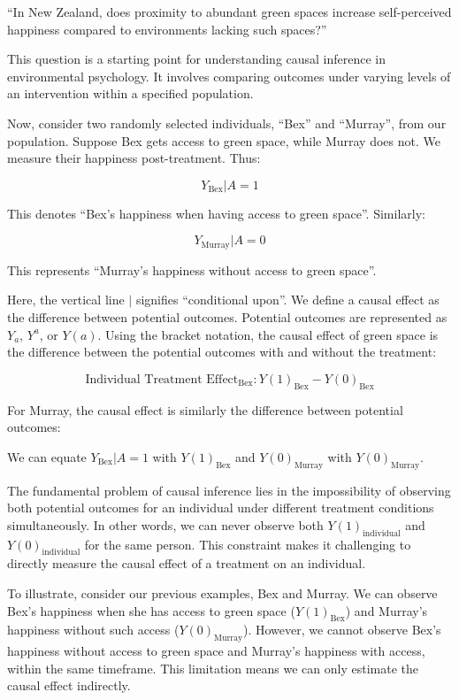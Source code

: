 \documentclass[
  singlecolumn]{article}
\begin{document}
``In New Zealand, does proximity to abundant green spaces increase
self-perceived happiness compared to environments lacking such spaces?''

This question is a starting point for understanding causal inference in
environmental psychology. It involves comparing outcomes under varying
levels of an intervention within a specified population.

Now, consider two randomly selected individuals, ``Bex'' and ``Murray'',
from our population. Suppose Bex gets access to green space, while
Murray does not. We measure their happiness post-treatment. Thus:

\[Y_{\text{Bex}}|A = 1 \]

This denotes ``Bex's happiness when having access to green space''.
Similarly:

\[Y_{\text{Murray}}|A = 0 \]

This represents ``Murray's happiness without access to green space''.

Here, the vertical line \(|\) signifies ``conditional upon''. We define
a causal effect as the difference between potential outcomes. Potential
outcomes are represented as \(Y_a\), \(Y^a\), or \(Y(a)\). Using the
bracket notation, the causal effect of green space is the difference
between the potential outcomes with and without the treatment:

\[\text{Individual Treatment Effect}_{\text{Bex}}: Y(1)_{\text{Bex}} - Y(0)_{\text{Bex}}\]

For Murray, the causal effect is similarly the difference between
potential outcomes:

We can equate \(Y_{\text{Bex}}|A = 1\) with \(Y(1)_{\text{Bex}}\) and
\(Y(0)_{\text{Murray}}\) with \(Y(0)_{\text{Murray}}\).

The fundamental problem of causal inference lies in the impossibility of
observing both potential outcomes for an individual under different
treatment conditions simultaneously. In other words, we can never
observe both \(Y(1)_{\text{individual}}\) and
\(Y(0)_{\text{individual}}\) for the same person. This constraint makes
it challenging to directly measure the causal effect of a treatment on
an individual.

To illustrate, consider our previous examples, Bex and Murray. We can
observe Bex's happiness when she has access to green space
(\(Y(1)_{\text{Bex}}\)) and Murray's happiness without such access
(\(Y(0)_{\text{Murray}}\)). However, we cannot observe Bex's happiness
without access to green space and Murray's happiness with access, within
the same timeframe. This limitation means we can only estimate the
causal effect indirectly.
\end{document}
